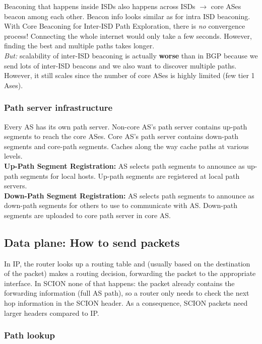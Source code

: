 \documentclass[11pt,oneside,a4paper]{article}
\begin{document}
Beaconing that happens inside ISDs also happens across ISDs $\rightarrow$ core ASes beacon among each other. Beacon info looks similar as for intra ISD beaconing. With Core Beaconing for Inter-ISD Path Exploration, there is \textit{no} convergence process! Connecting the whole internet would only take a few seconds. However, finding the best and multiple paths takes longer.\\
\textit{But:} scalability of inter-ISD beaconing is actually \textbf{worse} than in BGP because we send lots of inter-ISD beacons and we also want to discover multiple paths. However, it still scales since the number of core ASes is highly limited (few tier 1 Ases).

\subsubsection{Path server infrastructure}

\noindent Every AS has its own path server. Non-core AS's path server contains up-path segments to reach the core ASes. Core AS's path server contains down-path segments and core-path segments. Caches along the way cache paths at various levels.\\
\textbf{Up-Path Segment Registration:} AS selects path segments to announce
as up-path segments for local hosts. Up-path segments are registered at local path servers.\\
\textbf{Down-Path Segment Registration:} AS selects path segments to announce as down-path segments for others to use to communicate with AS. Down-path segments are uploaded to core path server in core AS.

\subsection{Data plane: How to send packets}

In IP, the router looks up a routing table and (usually based on the destination of the packet) makes a routing decision, forwarding the packet to the appropriate interface. In SCION none of that happens: the packet already contains the forwarding information (full AS path), so a router only needs to check the next hop information in the SCION header. As a consequence, SCION packets need larger headers compared to IP.

\subsubsection{Path lookup}
\end{document}
